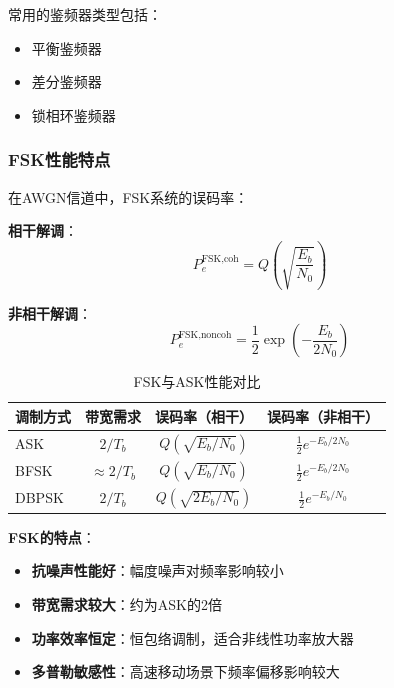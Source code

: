 常用的鉴频器类型包括：
\begin{itemize}
    \item 平衡鉴频器
    \item 差分鉴频器
    \item 锁相环鉴频器
\end{itemize}

\subsubsection{FSK性能特点}

在AWGN信道中，FSK系统的误码率：

\textbf{相干解调}：
\begin{equation}
    P_e^{\text{FSK,coh}} = Q\left(\sqrt{\frac{E_b}{N_0}}\right)
\end{equation}

\textbf{非相干解调}：
\begin{equation}
    P_e^{\text{FSK,noncoh}} = \frac{1}{2}\exp\left(-\frac{E_b}{2N_0}\right)
\end{equation}

\begin{table}[htbp]
    \centering
    \caption{FSK与ASK性能对比}
    \begin{tabular}{l|c|c|c}
        \hline
        调制方式 & 带宽需求 & 误码率（相干） & 误码率（非相干） \\
        \hline
        ASK & $2/T_b$ & $Q(\sqrt{E_b/N_0})$ & $\frac{1}{2}e^{-E_b/2N_0}$ \\
        \hline
        BFSK & $\approx 2/T_b$ & $Q(\sqrt{E_b/N_0})$ & $\frac{1}{2}e^{-E_b/2N_0}$ \\
        \hline
        DBPSK & $2/T_b$ & $Q(\sqrt{2E_b/N_0})$ & $\frac{1}{2}e^{-E_b/N_0}$ \\
        \hline
    \end{tabular}
    \label{tab:fsk_ask_comparison}
\end{table}

\textbf{FSK的特点}：
\begin{itemize}
    \item \textbf{抗噪声性能好}：幅度噪声对频率影响较小
    \item \textbf{带宽需求较大}：约为ASK的2倍
    \item \textbf{功率效率恒定}：恒包络调制，适合非线性功率放大器
    \item \textbf{多普勒敏感性}：高速移动场景下频率偏移影响较大
\end{itemize}

